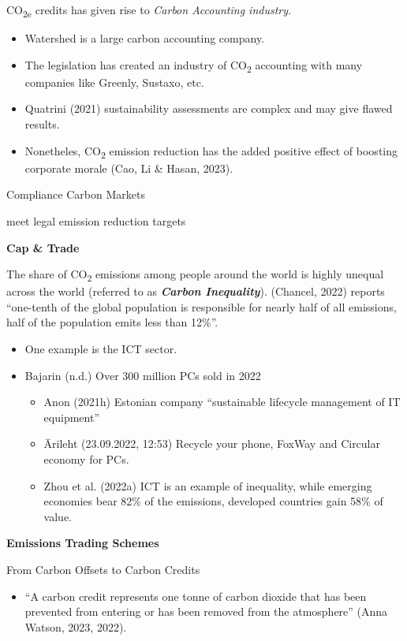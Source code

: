 \documentclass[
  letterpaper,
  DIV=11,
  numbers=noendperiod]{scrartcl}
\providecommand{\tightlist}{%
  \setlength{\itemsep}{0pt}\setlength{\parskip}{0pt}}\usepackage{longtable,booktabs,array}
\begin{document}
CO\textsubscript{2e} credits has given rise to \emph{Carbon Accounting
industry.}

\begin{itemize}
\item
  Watershed is a large carbon accounting company.
\item
  The legislation has created an industry of CO\textsubscript{2}
  accounting with many companies like Greenly, Sustaxo, etc.
\item
  Quatrini (2021) sustainability assessments are complex and may give
  flawed results.
\item
  Nonetheles, CO\textsubscript{2} emission reduction has the added
  positive effect of boosting corporate morale (Cao, Li \& Hasan, 2023).
\end{itemize}

Compliance Carbon Markets

meet legal emission reduction targets

\textbf{Cap \& Trade}

The share of CO\textsubscript{2} emissions among people around the world
is highly unequal across the world (referred to as \textbf{\emph{Carbon
Inequality}}). (Chancel, 2022) reports ``one-tenth of the global
population is responsible for nearly half of all emissions, half of the
population emits less than 12\%''.

\begin{itemize}
\item
  One example is the ICT sector.
\item
  Bajarin (n.d.) Over 300 million PCs sold in 2022

  \begin{itemize}
  \tightlist
  \item
    Anon (2021h) Estonian company ``sustainable lifecycle management of
    IT equipment''
  \item
    Ärileht (23.09.2022, 12:53) Recycle your phone, FoxWay and Circular
    economy for PCs.
  \item
    Zhou et al. (2022a) ICT is an example of inequality, while emerging
    economies bear 82\% of the emissions, developed countries gain 58\%
    of value.
  \end{itemize}
\end{itemize}

\textbf{Emissions Trading Schemes}

From Carbon Offsets to Carbon Credits

\begin{itemize}
\tightlist
\item
  ``A carbon credit represents one tonne of carbon dioxide that has been
  prevented from entering or has been removed from the atmosphere''
  (Anna Watson, 2023, 2022).
\end{itemize}
\end{document}
